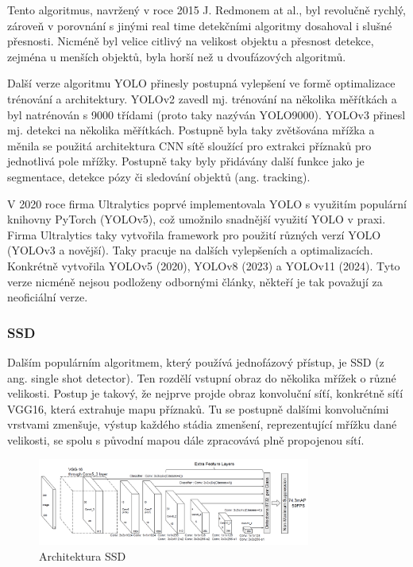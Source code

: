 Tento algoritmus, navržený v roce 2015 J. Redmonem at al., byl revolučně
rychlý, zároveň v porovnání s jinými real time detekčními algoritmy dosahoval i
slušné přesnosti. Nicméně byl velice citlivý na velikost objektu a přesnost
detekce, zejména u menších objektů, byla horší než u dvoufázových algoritmů.

Další verze algoritmu YOLO přinesly postupná vylepšení ve formě optimalizace
trénování a architektury. YOLOv2 \cite{yolo9000} zavedl mj. trénování na
několika měřítkách a byl natrénován s 9000 třídami (proto taky nazýván
YOLO9000). YOLOv3 \cite{yolov3} přinesl mj. detekci na několika měřítkách.
Postupně byla taky zvětšována mřížka a měnila se použitá architektura CNN sítě
sloužící pro extrakci příznaků pro jednotlivá pole mřížky. Postupně taky byly
přidávány další funkce jako je segmentace, detekce pózy či sledování objektů
(ang. tracking).

V 2020 roce firma Ultralytics poprvé implementovala YOLO s využitím populární
knihovny PyTorch (YOLOv5), což umožnilo snadnější využití YOLO v praxi. Firma
Ultralytics taky vytvořila framework pro použití různých verzí YOLO (YOLOv3 a
novější). Taky pracuje na dalších vylepšeních a optimalizacích. Konkrétně
vytvořila YOLOv5 (2020), YOLOv8 (2023) a YOLOv11 (2024). Tyto verze nicméně
nejsou podloženy odbornými články, někteří je tak považují za neoficiální
verze.

\subsubsection{SSD}
Dalším populárním algoritmem, který používá jednofázový přístup, je SSD (z ang.
single shot detector). \cite{szegedy:ssd} Ten rozdělí vstupní obraz do několika
mřížek o různé velikosti. Postup je takový, že nejprve projde obraz konvoluční
síťí, konkrétně síťí VGG16, která extrahuje mapu příznaků. Tu se postupně
dalšími konvolučními vrstvami zmenšuje, výstup každého stádia zmenšení,
reprezentující mřížku dané velikosti, se spolu s původní mapou dále zpracovává
plně propojenou sítí.
\begin{figure}[]
    \centering
    \includegraphics[width=0.8\textwidth]{Figures/ssd.png}
    \caption{Architektura SSD \cite{szegedy:ssd}}
    \label{fig:ssd}
\end{figure}

